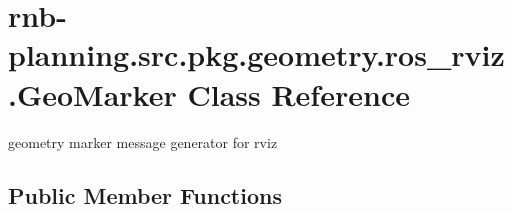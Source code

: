 \hypertarget{classrnb-planning_1_1src_1_1pkg_1_1geometry_1_1ros__rviz_1_1_geo_marker}{}\section{rnb-\/planning.src.\+pkg.\+geometry.\+ros\+\_\+rviz.\+Geo\+Marker Class Reference}
\label{classrnb-planning_1_1src_1_1pkg_1_1geometry_1_1ros__rviz_1_1_geo_marker}


geometry marker message generator for rviz  


\subsection*{Public Member Functions}

